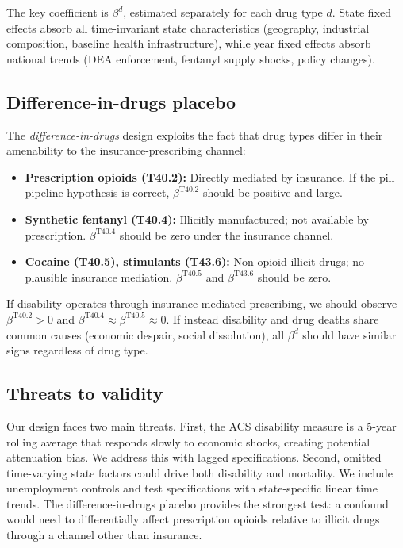 \documentclass[12pt]{article}
\begin{document}
The key coefficient is $\beta^{d}$, estimated separately for each drug type $d$. State fixed effects absorb all time-invariant state characteristics (geography, industrial composition, baseline health infrastructure), while year fixed effects absorb national trends (DEA enforcement, fentanyl supply shocks, policy changes).

\subsection{Difference-in-drugs placebo}

The \textit{difference-in-drugs} design exploits the fact that drug types differ in their amenability to the insurance-prescribing channel:

\begin{itemize}
    \item \textbf{Prescription opioids (T40.2):} Directly mediated by insurance. If the pill pipeline hypothesis is correct, $\beta^{\text{T40.2}}$ should be positive and large.
    \item \textbf{Synthetic fentanyl (T40.4):} Illicitly manufactured; not available by prescription. $\beta^{\text{T40.4}}$ should be zero under the insurance channel.
    \item \textbf{Cocaine (T40.5), stimulants (T43.6):} Non-opioid illicit drugs; no plausible insurance mediation. $\beta^{\text{T40.5}}$ and $\beta^{\text{T43.6}}$ should be zero.
\end{itemize}

If disability operates through insurance-mediated prescribing, we should observe $\beta^{\text{T40.2}} > 0$ and $\beta^{\text{T40.4}} \approx \beta^{\text{T40.5}} \approx 0$. If instead disability and drug deaths share common causes (economic despair, social dissolution), all $\beta^{d}$ should have similar signs regardless of drug type.

\subsection{Threats to validity}

Our design faces two main threats. First, the ACS disability measure is a 5-year rolling average that responds slowly to economic shocks, creating potential attenuation bias. We address this with lagged specifications. Second, omitted time-varying state factors could drive both disability and mortality. We include unemployment controls and test specifications with state-specific linear time trends. The difference-in-drugs placebo provides the strongest test: a confound would need to differentially affect prescription opioids relative to illicit drugs through a channel other than insurance.
\end{document}
